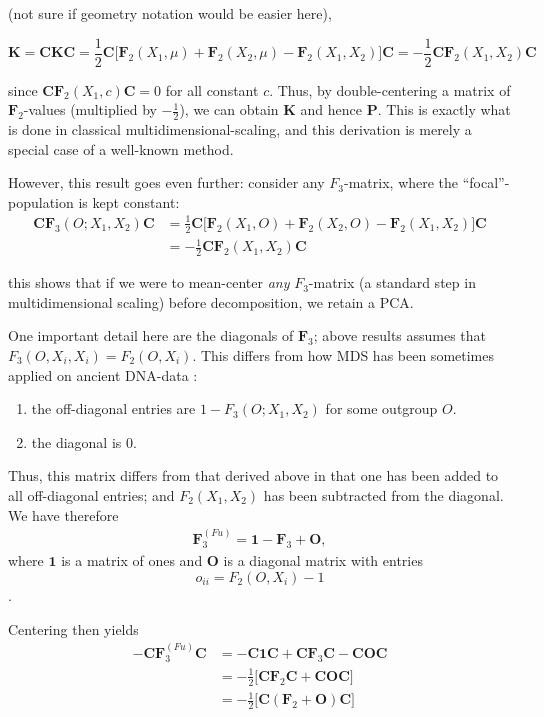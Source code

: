 \documentclass[10pt,a4paper]{article}
\newcommand{\MC}{\mathbf{C}} %
\newcommand{\MF}{\mathbf{F}_2} %
\newcommand{\MFT}{\mathbf{F}_3} %
\newcommand{\MP}{\mathbf{P}} %
\newcommand{\MK}{\mathbf{K}} %
\begin{document}
(not sure if geometry notation would be easier here),

\begin{equation}
\MK = \MC\MK\MC = \frac{1}{2}\MC\big[\MF(X_1, \mu) + \MF(X_2, \mu) - \MF(X_1, X_2)\big]\MC=-\frac{1}{2} \MC \MF(X_1, X_2) \MC
\end{equation}

since $\MC\MF(X_1, c)\MC = 0$ for all constant $c$. Thus, by double-centering a matrix of $\MF$-values (multiplied by $-\frac{1}{2}$), we can obtain $\MK$ and hence $\MP$. This is exactly what is done in classical multidimensional-scaling, and this derivation is merely a special case of a well-known method.

However, this result goes even further: consider any $F_3$-matrix, where the ``focal''-population is kept constant:
\begin{align}
\MC\MFT(O; X_1, X_2)\MC &= \frac{1}{2}\MC\big[\MF(X_1, O) + \MF(X_2, O) - \MF(X_1, X_2)\big]\MC\nonumber\\
 &=-\frac{1}{2} \MC \MF(X_1, X_2) \MC 
\end{align}

this shows that if we were to mean-center \emph{any} $F_3$-matrix (a standard step in multidimensional scaling) before decomposition, we retain a PCA.

One important detail here are the diagonals of $\MFT$; above results assumes that $F_3(O, X_i, X_i) = F_2(O, X_i)$. This differs from how MDS has been sometimes applied on ancient DNA-data \citep{fu2016}:
\begin{enumerate}
	\item the off-diagonal entries are $1 - F_3(O; X_1, X_2)$ for some outgroup $O$.
	\item the diagonal is 0.
\end{enumerate}
Thus, this matrix differs from that derived above in that one has been added to all off-diagonal entries; and $F_2(X_1,X_2)$ has been subtracted from the diagonal. We have therefore
\begin{align}
\MFT^{(Fu)} = \mathbf{1} - \MFT + \mathbf{O},
\end{align}
where $\mathbf{1}$ is a matrix of ones and $\mathbf{O}$ is a diagonal matrix with entries
$$o_{ii} = F_2(O, X_i) -1$$.

Centering then yields
\begin{align}
-\MC\MFT^{(Fu)}\MC &= -\MC\mathbf{1}\MC + \MC\MFT\MC - \MC\mathbf{O}\MC\nonumber\\
                  &= -\frac{1}{2}\big[\MC\MF\MC +\MC\mathbf{O}\MC\big]\nonumber\\
                  &= -\frac{1}{2}\big[\MC(\MF + \mathbf{O})\MC\big]
\end{align}
\end{document}
